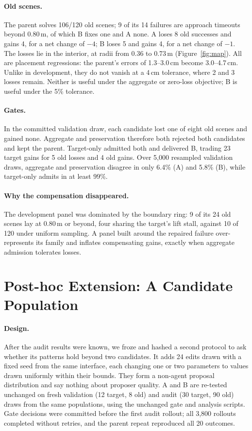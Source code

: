 \documentclass[letterpaper]{article} %
\begin{document}
\paragraph{Old scenes.} The parent solves 106/120 old scenes; 9 of its 14 failures are approach timeouts beyond 0.80\,m, of which B fixes one and A none. A loses 8 old successes and gains 4, for a net change of $-4$; B loses 5 and gains 4, for a net change of $-1$. The losses lie in the interior, at radii from 0.36 to 0.73\,m (Figure~\ref{fig:map}). All are placement regressions: the parent's errors of 1.3--3.0\,cm become 3.0--4.7\,cm. Unlike in development, they do not vanish at a 4\,cm tolerance, where 2 and 3 losses remain. Neither is useful under the aggregate or zero-loss objective; B is useful under the 5\% tolerance.

\paragraph{Gates.} In the committed validation draw, each candidate lost one of eight old scenes and gained none. Aggregate and preservation therefore both rejected both candidates and kept the parent. Target-only admitted both and delivered B, trading 23 target gains for 5 old losses and 4 old gains. Over 5{,}000 resampled validation draws, aggregate and preservation disagree in only 6.4\% (A) and 5.8\% (B), while target-only admits in at least 99\%.

\paragraph{Why the compensation disappeared.} The development panel was dominated by the boundary ring: 9 of its 24 old scenes lay at 0.80\,m or beyond, four sharing the target's lift stall, against 10 of 120 under uniform sampling. A panel built around the repaired failure over-represents its family and inflates compensating gains, exactly when aggregate admission tolerates losses.

\section{Post-hoc Extension: A Candidate Population}
\paragraph{Design.} After the audit results were known, we froze and hashed a second protocol to ask whether its patterns hold beyond two candidates. It adds 24 edits drawn with a fixed seed from the same interface, each changing one or two parameters to values drawn uniformly within their bounds. They form a non-agent proposal distribution and say nothing about proposer quality. A and B are re-tested unchanged on fresh validation (12 target, 8 old) and audit (30 target, 90 old) draws from the same populations, using the unchanged gate and analysis scripts. Gate decisions were committed before the first audit rollout; all 3{,}800 rollouts completed without retries, and the parent repeat reproduced all 20 outcomes.
\end{document}
